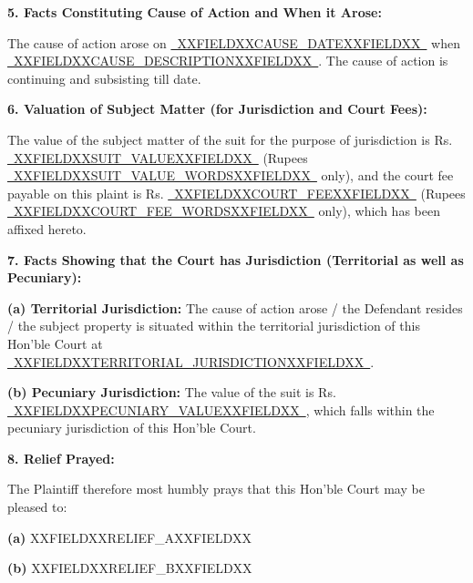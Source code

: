 \documentclass[12pt, a4paper]{article}
\newcommand{\fillline}[1]{\underline{~#1~}}
\begin{document}
\vspace{8pt}
\noindent \textbf{5. Facts Constituting Cause of Action and When it Arose:}

\noindent The cause of action arose on \fillline{XXFIELDXXCAUSE_DATEXXFIELDXX} when \fillline{XXFIELDXXCAUSE_DESCRIPTIONXXFIELDXX}. The cause of action is continuing and subsisting till date.

\vspace{8pt}
\noindent \textbf{6. Valuation of Subject Matter (for Jurisdiction and Court Fees):}

\noindent The value of the subject matter of the suit for the purpose of jurisdiction is Rs. \fillline{XXFIELDXXSUIT_VALUEXXFIELDXX} (Rupees \fillline{XXFIELDXXSUIT_VALUE_WORDSXXFIELDXX} only), and the court fee payable on this plaint is Rs. \fillline{XXFIELDXXCOURT_FEEXXFIELDXX} (Rupees \fillline{XXFIELDXXCOURT_FEE_WORDSXXFIELDXX} only), which has been affixed hereto.

\vspace{8pt}
\noindent \textbf{7. Facts Showing that the Court has Jurisdiction (Territorial as well as Pecuniary):}

\noindent \textbf{(a) Territorial Jurisdiction:} The cause of action arose / the Defendant resides / the subject property is situated within the territorial jurisdiction of this Hon'ble Court at \fillline{XXFIELDXXTERRITORIAL_JURISDICTIONXXFIELDXX}.

\vspace{6pt}
\noindent \textbf{(b) Pecuniary Jurisdiction:} The value of the suit is Rs. \fillline{XXFIELDXXPECUNIARY_VALUEXXFIELDXX}, which falls within the pecuniary jurisdiction of this Hon'ble Court.

\vspace{8pt}
\noindent \textbf{8. Relief Prayed:}

\noindent The Plaintiff therefore most humbly prays that this Hon'ble Court may be pleased to:

\vspace{4pt}
\noindent \textbf{(a)} XXFIELDXXRELIEF_AXXFIELDXX

\vspace{6pt}
\noindent \textbf{(b)} XXFIELDXXRELIEF_BXXFIELDXX
\end{document}
